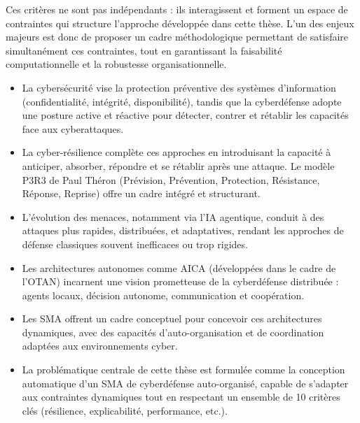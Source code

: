 \documentclass[ twoside,openright,titlepage,numbers=noenddot,headinclude,%
                footinclude=true,cleardoublepage=empty,abstractoff, %
                BCOR=5mm,paper=a4,fontsize=11pt,%
                french,american,%
                ]{scrreprt}
\begin{document}
Ces critères ne sont pas indépendants : ils interagissent et forment un espace de contraintes qui structure l'approche développée dans cette thèse. L'un des enjeux majeurs est donc de proposer un cadre méthodologique permettant de satisfaire simultanément ces contraintes, tout en garantissant la faisabilité computationnelle et la robustesse organisationnelle.

\begin{tcolorbox}[colback=gray!5!white, colframe=gray!60!black, title={\faLightbulbO{} Points clés à retenir du Chapitre 1}]
    \begin{itemize}
        \item La cybersécurité vise la protection préventive des systèmes d'information (confidentialité, intégrité, disponibilité), tandis que la cyberdéfense adopte une posture active et réactive pour détecter, contrer et rétablir les capacités face aux cyberattaques.

        \item La cyber-résilience complète ces approches en introduisant la capacité à anticiper, absorber, répondre et se rétablir après une attaque. Le modèle P3R3 de Paul Théron (Prévision, Prévention, Protection, Résistance, Réponse, Reprise) offre un cadre intégré et structurant.

        \item L'évolution des menaces, notamment via l'IA agentique, conduit à des attaques plus rapides, distribuées, et adaptatives, rendant les approches de défense classiques souvent inefficaces ou trop rigides.

        \item Les architectures autonomes comme AICA (développées dans le cadre de l'OTAN) incarnent une vision prometteuse de la cyberdéfense distribuée : agents locaux, décision autonome, communication et coopération.

        \item Les SMA offrent un cadre conceptuel pour concevoir ces architectures dynamiques, avec des capacités d'auto-organisation et de coordination adaptées aux environnements cyber.

        \item La problématique centrale de cette thèse est formulée comme la conception automatique d'un SMA de cyberdéfense auto-organisé, capable de s'adapter aux contraintes dynamiques tout en respectant un ensemble de 10 critères clés (résilience, explicabilité, performance, etc.).
    \end{itemize}
\end{tcolorbox}
\end{document}
